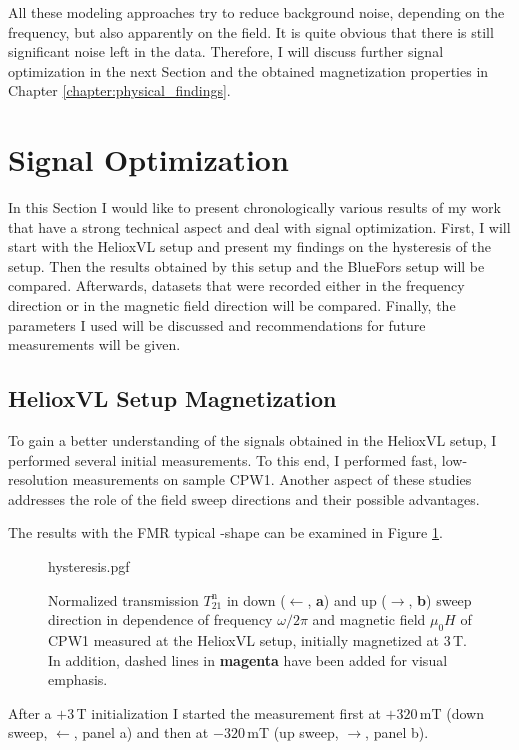 All these modeling approaches try to reduce background noise, depending on the frequency, but also apparently on the field. It is quite obvious that there is still significant noise left in the data. Therefore, I will discuss further signal optimization in the next Section and the obtained magnetization properties in Chapter \ref{chapter:physical_findings}. 

\section{Signal Optimization}
In this Section I would like to present chronologically various results of my work that have a strong technical aspect and deal with signal optimization. First, I will start with the HelioxVL setup and present my findings on the hysteresis of the setup. Then the results obtained by this setup and the BlueFors setup will be compared. Afterwards, datasets that were recorded either in the frequency direction or in the magnetic field direction will be compared. Finally, the parameters I used will be discussed and recommendations for future measurements will be given.

\subsection{HelioxVL Setup Magnetization} \label{sec:analysis_hysteresis}
To gain a better understanding of the signals obtained in the HelioxVL setup, I performed several initial measurements. To this end, I performed fast, low-resolution measurements on sample CPW1.
Another aspect of these studies addresses the role of the field sweep directions and their possible advantages.

The results with the FMR typical -shape can be examined in Figure \ref{fig:analysis_hysteresis}. 
\begin{figure}
    \centering
    {hysteresis.pgf}
    \caption[Normalized transmission data in down and up sweep direction]{Normalized transmission $T_{21}^\text{n}$ in down ({\color{seeblau100}$\pmb{\leftarrow}$}, \textbf{\color{antiseeblau100}a}) and up ({\color{seeblau100}$\pmb{\rightarrow}$}, \textbf{\color{antiseeblau100}b}) sweep direction in dependence of frequency $\omega/2\pi$ and magnetic field $\mu_0H$ of CPW1 measured at the HelioxVL setup, initially magnetized at $3\,$T. In addition, dashed lines in \textbf{\color{antiseeblau100}magenta} have been added for visual emphasis.}
    \label{fig:analysis_hysteresis}
\end{figure}
After a $+3\,$T initialization I started the measurement first at $+320\,$mT (down sweep, {\color{seeblau100}$\pmb{\leftarrow}$}, panel a) and then at $-320\,$mT (up sweep, {\color{seeblau100}$\pmb{\rightarrow}$}, panel b).

